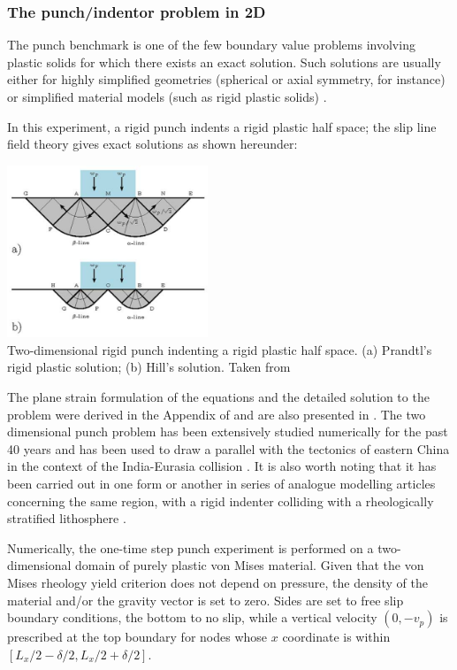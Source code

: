 \subsubsection{The punch/indentor problem in 2D} \label{sec:punch}

The punch benchmark is one of the few boundary value problems involving plastic solids for which there exists an exact solution. 
Such solutions are usually either for highly simplified geometries (spherical or axial symmetry, for instance) or simplified material models (such as rigid plastic solids) \cite{kacha04}.

In this experiment, a rigid punch indents a rigid plastic half space; the slip line field theory gives 
exact solutions as shown hereunder:

\begin{center}
\includegraphics[width=6cm]{images/benchmark_punch/thfb08}\\
{\captionfont Two-dimensional rigid punch indenting a rigid
plastic half space. (a) Prandtl’s rigid plastic solution; (b)
Hill’s solution. Taken from \cite{thfb08}}
\end{center}


The plane strain formulation of the equations and the detailed solution to the problem were derived in the Appendix of \cite{thfb08} and are also presented in \cite{gepd98}.
The two dimensional punch problem has been extensively studied numerically for the past 40 years 
\cite{zihl75,prlo90,zihp95,chpe01,chan99,huhy99,yuti06,bufs08,raab07,gltf18} and has been used to draw a parallel with the tectonics of eastern China 
in the context of the India-Eurasia collision \cite{tamo76,mota77,engl82}.
It is also worth noting that it has been carried out in one form or another in series of 
analogue modelling articles concerning the same region, with a rigid indenter colliding with a rheologically 
stratified lithosphere \cite{peta88,daco88,jodc90}.
 
Numerically, the one-time step punch experiment is performed on a two-dimensional
domain of purely plastic von Mises material. 
Given that the von Mises rheology yield criterion does not depend on pressure, the density of the material and/or the gravity vector is set to zero. Sides are set to free slip boundary conditions, the bottom to no slip, while a vertical velocity $(0,-v_p)$ is prescribed at the top boundary for nodes whose $x$ coordinate is within $[L_x/2-\delta/2,L_x/2+\delta/2]$. 

